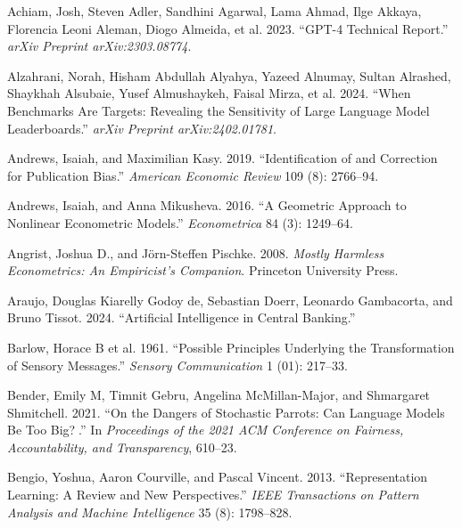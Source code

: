 \documentclass[
]{article}
\newlength{\cslhangindent}
\newenvironment{CSLReferences}[2] %
 {\begin{list}{}{%
  \setlength{\itemindent}{0pt}
  \setlength{\leftmargin}{0pt}
  \setlength{\parsep}{0pt}
  \ifodd #1
   \setlength{\leftmargin}{\cslhangindent}
   \setlength{\itemindent}{-1\cslhangindent}
  \fi
  \setlength{\itemsep}{#2\baselineskip}}}
 {\end{list}}
\begin{document}
\label{refs}
\begin{CSLReferences}{1}{0}
Achiam, Josh, Steven Adler, Sandhini Agarwal, Lama Ahmad, Ilge Akkaya,
Florencia Leoni Aleman, Diogo Almeida, et al. 2023. {``GPT-4 Technical
Report.''} \emph{arXiv Preprint arXiv:2303.08774}.

Alzahrani, Norah, Hisham Abdullah Alyahya, Yazeed Alnumay, Sultan
Alrashed, Shaykhah Alsubaie, Yusef Almushaykeh, Faisal Mirza, et al.
2024. {``When Benchmarks Are Targets: Revealing the Sensitivity of Large
Language Model Leaderboards.''} \emph{arXiv Preprint arXiv:2402.01781}.

Andrews, Isaiah, and Maximilian Kasy. 2019. {``Identification of and
Correction for Publication Bias.''} \emph{American Economic Review} 109
(8): 2766--94.

Andrews, Isaiah, and Anna Mikusheva. 2016. {``A Geometric Approach to
Nonlinear Econometric Models.''} \emph{Econometrica} 84 (3): 1249--64.

Angrist, Joshua D., and Jörn-Steffen Pischke. 2008. \emph{Mostly
Harmless Econometrics: An Empiricist's Companion}. Princeton University
Press.

Araujo, Douglas Kiarelly Godoy de, Sebastian Doerr, Leonardo Gambacorta,
and Bruno Tissot. 2024. {``Artificial Intelligence in Central
Banking.''}

Barlow, Horace B et al. 1961. {``Possible Principles Underlying the
Transformation of Sensory Messages.''} \emph{Sensory Communication} 1
(01): 217--33.

Bender, Emily M, Timnit Gebru, Angelina McMillan-Major, and Shmargaret
Shmitchell. 2021. {``On the Dangers of Stochastic Parrots: Can Language
Models Be Too Big?🦜.''} In \emph{Proceedings of the 2021 ACM Conference
on Fairness, Accountability, and Transparency}, 610--23.

Bengio, Yoshua, Aaron Courville, and Pascal Vincent. 2013.
{``Representation Learning: A Review and New Perspectives.''} \emph{IEEE
Transactions on Pattern Analysis and Machine Intelligence} 35 (8):
1798--828.


\end{CSLReferences}
\end{document}

